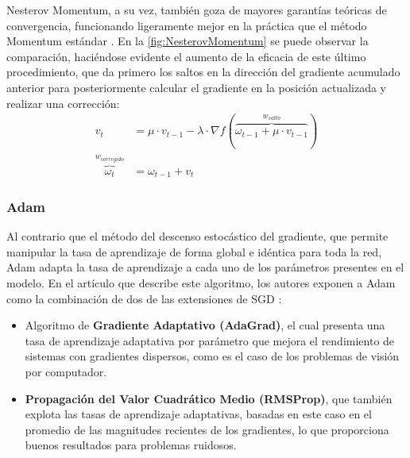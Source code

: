 Nesterov Momentum, a su vez, también goza de mayores garantías teóricas de convergencia, funcionando ligeramente mejor en la práctica que el método Momentum estándar \cite{Sutskever}. En la \autoref{fig:NesterovMomentum} se puede observar la comparación, haciéndose evidente el aumento de la eficacia de este último procedimiento, que da primero los saltos en la dirección del gradiente acumulado anterior para posteriormente calcular el gradiente en la posición actualizada y realizar una corrección:
\begin{align*}
    v_t &= \mu \cdot v_{t-1} - \lambda \cdot \nabla f(\overbrace{\omega_{t-1} + \mu \cdot v_{t-1}}^{w_{salto}})\\
    \overbrace{\omega_t}^{w_{corregido}} &= \omega_{t-1} + v_t
\end{align*}

\subsubsection{Adam}

Al contrario que el método del descenso estocástico del gradiente, que permite manipular la tasa de aprendizaje de forma global e idéntica para toda la red, Adam adapta la tasa de aprendizaje a cada uno de los parámetros presentes en el modelo. En el artículo que describe este algoritmo, los autores exponen a Adam como la combinación de dos de las extensiones de SGD \cite{Adam}:
\begin{itemize}
  \item Algoritmo de \textbf{Gradiente Adaptativo (AdaGrad)}, el cual presenta una tasa de aprendizaje adaptativa por parámetro que mejora el rendimiento de sistemas con gradientes dispersos, como es el caso de los problemas de visión por computador. 
  \item \textbf{Propagación del Valor Cuadrático Medio (RMSProp)}, que también explota las tasas de aprendizaje adaptativas, basadas en este caso en el promedio de las magnitudes recientes de los gradientes, lo que proporciona buenos resultados para problemas ruidosos. 
\end{itemize}


